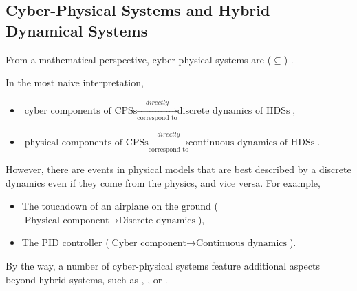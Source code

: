 \subsection{Cyber-Physical Systems and Hybrid Dynamical Systems}


From a mathematical perspective, cyber-physical systems are ($\subseteq$) 
.


In the most naive interpretation, 
\vspace{-.5cm}
\begin{itemize}
  \item $\text{cyber components of CPSs} \xrightarrow[\text{correspond to}]
    {directly} \text{discrete dynamics of HDSs}$,
  \item $\text{physical components of CPSs} \xrightarrow[\text{correspond to}]
    {directly} \text{continuous dynamics of HDSs}$.
\end{itemize}

However, there are events in physical models that are best described by 
a discrete dynamics even if they come from the physics, and vice versa.
For example, 
\vspace{-.5cm}
\begin{itemize}
  \item The touchdown of an airplane on the ground 
    ($\text{Physical component} \to \text{Discrete dynamics}$),
  \item The PID controller 
    ($\text{Cyber component} \to \text{Continuous dynamics}$).
\end{itemize}

By the way, a number of cyber-physical systems feature additional 
  aspects beyond hybrid systems,
such as , ,
  or .

